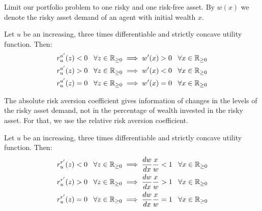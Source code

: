 \documentclass[twoside]{article}
\begin{document}
Limit our portfolio problem to one risky and one risk-free asset. By $w(x)$ we denote the risky asset demand of an agent with initial wealth $x$.

\begin{proposition}
    Let $u$ be an increasing, three times differentiable and strictly concave utility function. Then:
    \begin{align*}
        r^{a'}_u(z) < 0 \;\;\; \forall z \in \mathbb{R}_{\geq 0} & \implies w'(x) > 0 \;\;\; \forall x \in \mathbb{R}_{\geq 0} \\
        r^{a'}_u(z) > 0 \;\;\; \forall z \in \mathbb{R}_{\geq 0} & \implies w'(x) < 0 \;\;\; \forall x \in \mathbb{R}_{\geq 0} \\
        r^{a'}_u(z) = 0 \;\;\; \forall z \in \mathbb{R}_{\geq 0} & \implies w'(x) = 0 \;\;\; \forall x \in \mathbb{R}_{\geq 0}
    \end{align*}
\end{proposition}

The absolute risk aversion coefficient gives information of changes in the levels of the risky asset demand, not in the percentage of wealth invested in the risky asset. For that, we use the relative risk aversion coefficient.

\begin{proposition}
    Let $u$ be an increasing, three times differentiable and strictly concave utility function. Then:
    \begin{align*}
        r^{r'}_u(z) < 0 \;\;\; \forall z \in \mathbb{R}_{\geq 0} & \implies \frac{dw}{dx}\frac{x}{w} < 1 \;\;\; \forall x \in \mathbb{R}_{\geq 0} \\
        r^{r'}_u(z) > 0 \;\;\; \forall z \in \mathbb{R}_{\geq 0} & \implies \frac{dw}{dx}\frac{x}{w} > 1 \;\;\; \forall x \in \mathbb{R}_{\geq 0} \\
        r^{r'}_u(z) = 0 \;\;\; \forall z \in \mathbb{R}_{\geq 0} & \implies \frac{dw}{dx}\frac{x}{w} = 1 \;\;\; \forall x \in \mathbb{R}_{\geq 0}
    \end{align*}
\end{proposition}
\end{document}
